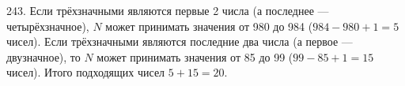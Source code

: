 243. Если трёхзначными являются первые 2 числа (а последнее --- четырёхзначное), $N$ может принимать значения от 980 до 984 ($984-980+1=5$ чисел). Если трёхзначными являются последние два числа (а первое --- двузначное), то $N$ может принимать значения от 85 до 99 ($99-85+1=15$ чисел). Итого подходящих чисел $5+15=20.$\\
